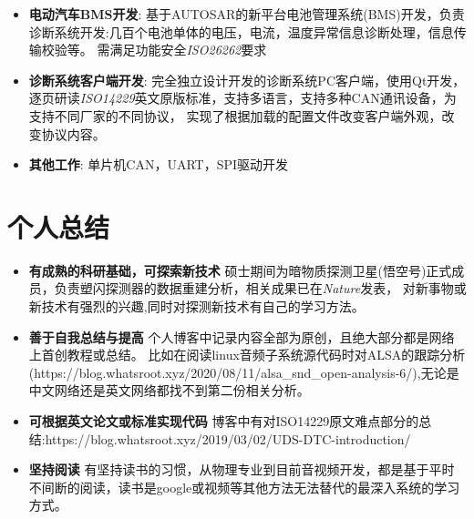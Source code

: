 \documentclass{resume}
\begin{document}
\begin{itemize}[parsep=0.2ex]
    \item \textbf{电动汽车BMS开发}: \newline
    基于AUTOSAR的新平台电池管理系统(BMS)开发，负责诊断系统开发:几百个电池单体的电压，电流，温度异常信息诊断处理，信息传输校验等。
    需满足功能安全\emph{ISO26262}要求
  \item \textbf{诊断系统客户端开发}: \newline
    完全独立设计开发的诊断系统PC客户端，使用Qt开发，逐页研读\emph{ISO14229}英文原版标准，支持多语言，支持多种CAN通讯设备，为支持不同厂家的不同协议，
    实现了根据加载的配置文件改变客户端外观，改变协议内容。
  \item \textbf{其他工作}: \newline
    单片机CAN，UART，SPI驱动开发
\end{itemize}

\section{个人总结}
\begin{itemize}[parsep=0.2ex]
  \item \textbf{有成熟的科研基础，可探索新技术}\newline
    硕士期间为暗物质探测卫星(悟空号)正式成员，负责塑闪探测器的数据重建分析，相关成果已在\emph{Nature}发表，
    对新事物或新技术有强烈的兴趣,同时对探测新技术有自己的学习方法。
  \item \textbf{善于自我总结与提高}\newline
  个人博客中记录内容全部为原创，且绝大部分都是网络上首创教程或总结。
  比如在阅读linux音频子系统源代码时对ALSA的跟踪分析(https://blog.whatsroot.xyz/2020/08/11/alsa\_snd\_open-analysis-6/),无论是中文网络还是英文网络都找不到第二份相关分析。
  \item \textbf{可根据英文论文或标准实现代码}\newline
  博客中有对ISO14229原文难点部分的总结:https://blog.whatsroot.xyz/2019/03/02/UDS-DTC-introduction/
  \item \textbf{坚持阅读}\newline
  有坚持读书的习惯，从物理专业到目前音视频开发，都是基于平时不间断的阅读，读书是google或视频等其他方法无法替代的最深入系统的学习方式。
\end{itemize}
\end{document}
